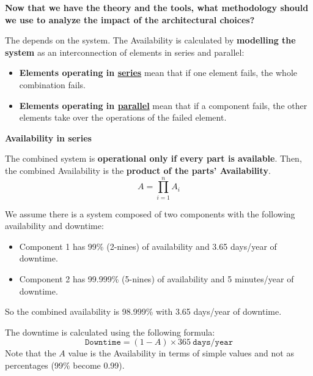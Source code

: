 \newpage

\begin{flushleft}
    \textcolor{Green3}{ \textbf{Now that we have the theory and the tools, what methodology should we use to analyze the impact of the architectural choices?}}
\end{flushleft}
The  depends on the system. The Availability is calculated by \textbf{modelling the system} as an interconnection of elements in series and parallel:
\begin{itemize}
    \item \textbf{Elements operating in \underline{series}} mean that if one element fails, the whole combination fails.
    
    \item \textbf{Elements operating in \underline{parallel}} mean that if a component fails, the other elements take over the operations of the failed element.
\end{itemize}

\begin{flushleft}
    \textcolor{Red2}{ \textbf{Availability in series}}
\end{flushleft}
The combined system is \textbf{operational only if every part is available}. Then, the combined Availability is the \textbf{product of the parts' Availability}.
\begin{equation}\label{eq: availability in series}
    A = \displaystyle\prod_{i=1}^{n} A_{i}
\end{equation}
\begin{examplebox}
    We assume there is a system composed of two components with the following availability and downtime:
    \begin{itemize}
        \item Component 1 has 99\% (2-nines) of availability and 3.65 days/year of downtime.
        \item Component 2 has 99.999\% (5-nines) of availability and 5 minutes/year of downtime.
    \end{itemize}
    So the combined availability is 98.999\% with 3.65 days/year of downtime. 
\end{examplebox}

\noindent
The downtime is calculated using the following formula:
\begin{equation*}
    \texttt{Downtime} = \left(1-A\right) \times 365 \:\texttt{days}/\texttt{year}
\end{equation*}
Note that the $A$ value is the Availability in terms of simple values and not as percentages (99\% become 0.99).


